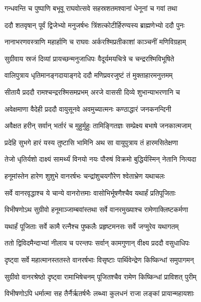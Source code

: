 \twolineshloka
{गन्धवन्ति च पुष्पाणि बभूवू राघवोत्सवे}
{सहस्रशतमश्वानां धेनूनां च गवां तथा} %

\twolineshloka
{ददौ शतवृषान् पूर्वं द्विजेभ्यो मनुजर्षभः}
{त्रिंशत्कोटीर्हिरण्यस्य ब्राह्मणेभ्यो ददौ पुनः} %

\twolineshloka
{नानाभरणवस्त्राणि महार्हाणि च राघवः}
{अर्करश्मिप्रतीकाशां काञ्चनीं मणिविग्रहाम्} %

\twolineshloka
{सुग्रीवाय स्रजं दिव्यां प्रायच्छन्मनुजाधिपः}
{वैदूर्यमयचित्रे च चन्द्ररश्मिविभूषिते} %

\twolineshloka
{वालिपुत्राय धृतिमानङ्गदायाङ्गदे ददौ}
{मणिप्रवरजुष्टं तं मुक्ताहारमनुत्तमम्} %

\twolineshloka
{सीतायै प्रददौ रामश्चन्द्ररश्मिसमप्रभम्}
{अरजे वाससी दिव्ये शुभान्याभरणानि च} %

\twolineshloka
{अवेक्षमाणा वैदेही प्रददौ वायुसूनवे}
{अवमुच्यात्मनः कण्ठाद्धारं जनकनन्दिनी} %

\twolineshloka
{अवैक्षत हरीन् सर्वान् भर्तारं च मुहुर्मुहुः}
{तामिङ्गितज्ञः सम्प्रेक्ष्य बभाषे जनकात्मजाम्} %

\twolineshloka
{प्रदेहि सुभगे हारं यस्य तुष्टासि भामिनि}
{अथ सा वायुपुत्राय तं हारमसितेक्षणा} %

\twolineshloka
{तेजो धृतिर्यशो दाक्ष्यं सामर्थ्यं विनयो नयः}
{पौरुषं विक्रमो बुद्धिर्यस्मिन् नेतानि नित्यदा} %

\twolineshloka
{हनूमांस्तेन हारेण शुशुभे वानरर्षभः}
{चन्द्रांशुचयगौरेण श्वेताभ्रेण यथाचलः} %

\twolineshloka
{सर्वे वानरवृद्धाश्च ये चान्ये वानरोत्तमाः}
{वासोभिर्भूषणैश्चैव यथार्हं प्रतिपूजिताः} %

\twolineshloka
{विभीषणोऽथ सुग्रीवो हनूमाञ्जाम्बवांस्तथा}
{सर्वे वानरमुख्याश्च रामेणाक्लिष्टकर्मणा} %

\twolineshloka
{यथार्हं पूजिताः सर्वे कामै रत्नैश्च पुष्कलैः}
{प्रहृष्टमनसः सर्वे जग्मुरेव यथागतम्} %

\twolineshloka
{ततो द्विविदमैन्दाभ्यां नीलाय च परन्तपः}
{सर्वान् कामगुणान् वीक्ष्य प्रददौ वसुधाधिपः} %

\twolineshloka
{दृष्ट्वा सर्वे महात्मानस्ततस्ते वानरर्षभाः}
{विसृष्टाः पार्थिवेन्द्रेण किष्किन्धां समुपागमन्} %

\twolineshloka
{सुग्रीवो वानरश्रेष्ठो दृष्ट्वा रामाभिषेचनम्}
{पूजितश्चैव रामेण किष्किन्धां प्राविशत् पुरीम्} %

\twolineshloka
{विभीषणोऽपि धर्मात्मा सह तैर्नैर्ऋतर्षभैः}
{लब्ध्वा कुलधनं राजा लङ्कां प्रायान्महायशाः} %

